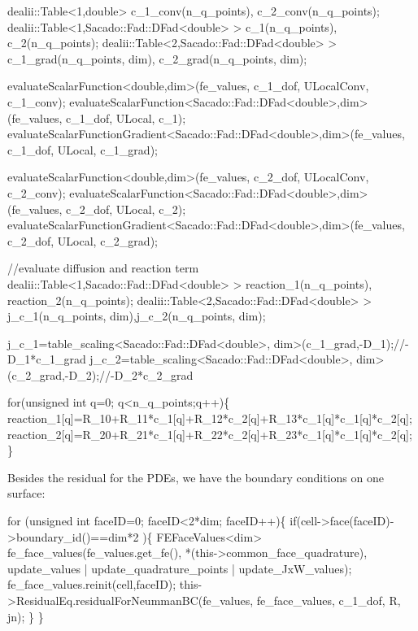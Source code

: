 \begin{DoxyCode}
dealii::Table<1,double>  c\_1\_conv(n\_q\_points), c\_2\_conv(n\_q\_points);
dealii::Table<1,Sacado::Fad::DFad<double> > c\_1(n\_q\_points), c\_2(n\_q\_points);
dealii::Table<2,Sacado::Fad::DFad<double> >  c\_1\_grad(n\_q\_points, dim), c\_2\_grad(n\_q\_points, dim);

evaluateScalarFunction<double,dim>(fe\_values, c\_1\_dof, ULocalConv, c\_1\_conv);
evaluateScalarFunction<Sacado::Fad::DFad<double>,dim>(fe\_values, c\_1\_dof, ULocal, c\_1); 
evaluateScalarFunctionGradient<Sacado::Fad::DFad<double>,dim>(fe\_values, c\_1\_dof, ULocal, c\_1\_grad);

evaluateScalarFunction<double,dim>(fe\_values, c\_2\_dof, ULocalConv, c\_2\_conv);
evaluateScalarFunction<Sacado::Fad::DFad<double>,dim>(fe\_values, c\_2\_dof, ULocal, c\_2); 
evaluateScalarFunctionGradient<Sacado::Fad::DFad<double>,dim>(fe\_values, c\_2\_dof, ULocal, c\_2\_grad);


\textcolor{comment}{//evaluate diffusion and reaction term}
dealii::Table<1,Sacado::Fad::DFad<double> > reaction\_1(n\_q\_points), reaction\_2(n\_q\_points);
dealii::Table<2,Sacado::Fad::DFad<double> > j\_c\_1(n\_q\_points, dim),j\_c\_2(n\_q\_points, dim);

j\_c\_1=table\_scaling<Sacado::Fad::DFad<double>, dim>(c\_1\_grad,-D\_1);\textcolor{comment}{//-D\_1*c\_1\_grad}
j\_c\_2=table\_scaling<Sacado::Fad::DFad<double>, dim>(c\_2\_grad,-D\_2);\textcolor{comment}{//-D\_2*c\_2\_grad}

\textcolor{keywordflow}{for}(\textcolor{keywordtype}{unsigned} \textcolor{keywordtype}{int} q=0; q<n\_q\_points;q++)\{
    reaction\_1[q]=R\_10+R\_11*c\_1[q]+R\_12*c\_2[q]+R\_13*c\_1[q]*c\_1[q]*c\_2[q];
    reaction\_2[q]=R\_20+R\_21*c\_1[q]+R\_22*c\_2[q]+R\_23*c\_1[q]*c\_1[q]*c\_2[q];
\}
\end{DoxyCode}
 Besides the residual for the P\-D\-Es, we have the boundary conditions on one surface\-: 
\begin{DoxyCode}
\textcolor{keywordflow}{for} (\textcolor{keywordtype}{unsigned} \textcolor{keywordtype}{int} faceID=0; faceID<2*dim; faceID++)\{
    \textcolor{keywordflow}{if}(cell->face(faceID)->boundary\_id()==dim*2 )\{
      FEFaceValues<dim> fe\_face\_values(fe\_values.get\_fe(), *(this->common\_face\_quadrature), update\_values |
       update\_quadrature\_points | update\_JxW\_values);
        fe\_face\_values.reinit(cell,faceID);
        this->ResidualEq.residualForNeummanBC(fe\_values, fe\_face\_values, c\_1\_dof, R, jn);
    \}
\}
\end{DoxyCode}
